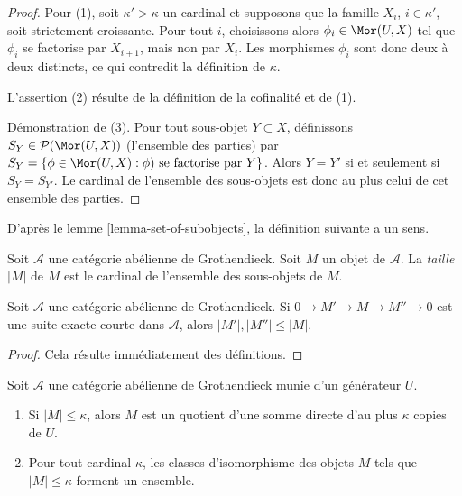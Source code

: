 \begin{proof}
Pour (1), soit $\kappa' > \kappa$ un cardinal et supposons que
la famille $X_i$, $i \in \kappa'$, soit strictement croissante. Pour tout
$i$, choisissons alors $\phi_i \in \Mor(U, X)$ tel que $\phi_i$ se factorise
par $X_{i + 1}$, mais non par $X_i$. Les morphismes $\phi_i$ sont donc
deux à deux distincts, ce qui contredit la définition de $\kappa$.

\medskip\noindent
L'assertion (2) résulte de la définition de la cofinalité et de (1).

\medskip\noindent
Démonstration de (3). Pour tout sous-objet $Y \subset X$, définissons
$S_Y \in \mathcal{P}(\Mor(U, X))$ (l'ensemble des parties) par
$S_Y = \{\phi \in \Mor(U,X) : \phi)\text{ se factorise par }Y\}$.
Alors $Y = Y'$ si et seulement si $S_Y = S_{Y'}$. Le cardinal de
l'ensemble des sous-objets est donc au plus celui de cet ensemble des parties.
\end{proof}

\noindent
D'après le lemme \ref{lemma-set-of-subobjects}, la définition suivante
a un sens.

\begin{definition}
\label{definition-size}
Soit $\mathcal{A}$ une catégorie abélienne de Grothendieck.
Soit $M$ un objet de $\mathcal{A}$.
La {\it taille} $|M|$ de $M$ est le cardinal de l'ensemble des sous-objets
de $M$.
\end{definition}

\begin{lemma}
\label{lemma-size-goes-down}
Soit $\mathcal{A}$ une catégorie abélienne de Grothendieck.
Si $0 \to M' \to M \to M'' \to 0$ est une suite exacte courte dans
$\mathcal{A}$, alors $|M'|, |M''| \leq |M|$.
\end{lemma}

\begin{proof}
Cela résulte immédiatement des définitions.
\end{proof}

\begin{lemma}
\label{lemma-set-iso-classes-bounded-size}
Soit $\mathcal{A}$ une catégorie abélienne de Grothendieck munie d'un
générateur $U$.
\begin{enumerate}
\item Si $|M| \leq \kappa$, alors $M$ est un quotient d'une somme directe
d'au plus $\kappa$ copies de $U$.
\item Pour tout cardinal $\kappa$, les classes d'isomorphisme des objets
$M$ tels que $|M| \leq \kappa$ forment un ensemble.
\end{enumerate}
\end{lemma}

